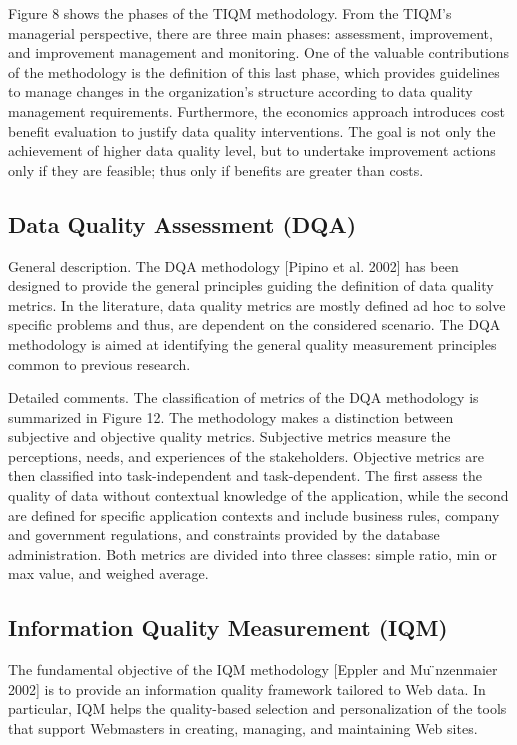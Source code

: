 \documentclass[pdftex,english,oribibl]{llncs}
\begin{document}
    Figure 8 shows the phases of the TIQM methodology.
    From the TIQM’s managerial perspective, there are three main phases: assessment, improvement, and improvement management and monitoring.
    One of the valuable contributions of the methodology is the definition of this last phase, which provides guidelines to manage changes in the organization’s structure according to data quality management requirements.
    Furthermore, the economics approach introduces cost benefit evaluation to justify data quality interventions.
    The goal is not only the achievement of higher data quality level, but to undertake improvement actions only if they are feasible; thus only if benefits are greater than costs.

    \subsection{Data Quality Assessment (DQA)}
    General description. The DQA methodology [Pipino et al. 2002] has been designed to provide the general principles guiding the definition of data quality metrics. In the literature, data quality metrics are mostly defined ad hoc to solve specific problems and thus, are dependent on the considered scenario. The DQA methodology is aimed at identifying the general quality measurement principles common to previous research.

    Detailed comments. The classification of metrics of the DQA methodology is summarized in Figure 12. The methodology makes a distinction between subjective and objective quality metrics. Subjective metrics measure the perceptions, needs, and experiences of the stakeholders. Objective metrics are then classified into task-independent and task-dependent. The first assess the quality of data without contextual knowledge of the application, while the second are defined for specific application contexts and include business rules, company and government regulations, and constraints provided by the database administration. Both metrics are divided into three classes: simple ratio, min or max value, and weighed average.


    \subsection{Information Quality Measurement (IQM)}
    The fundamental objective of the IQM methodology [Eppler and Mu ̈nzenmaier 2002] is to provide an information quality framework tailored to Web data.
    In particular, IQM helps the quality-based selection and personalization of the tools that support Webmasters in creating, managing, and maintaining Web sites.
\end{document}
